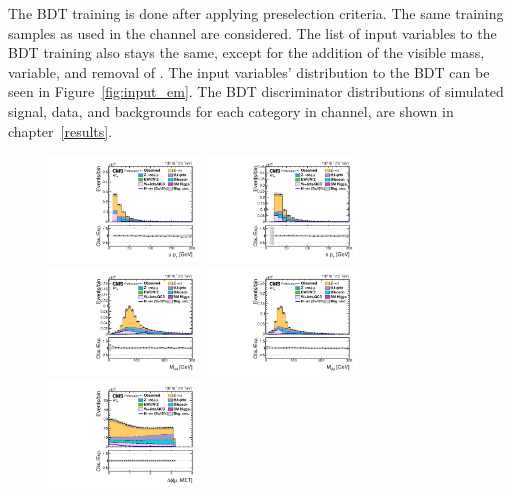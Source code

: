 The BDT training is done after applying preselection criteria. The same training samples as used in the \mue channel are considered. The list of input variables to the BDT training also stays the same, except for the addition of the visible mass, \mvis variable, and removal of \mtemet. The input variables' distribution to the BDT can be seen in Figure~\ref{fig:input_em}. The BDT discriminator distributions of simulated signal, data, and backgrounds for each category in \emu channel, are shown in chapter~\ref{results}.

\begin{figure}[htbp!]
  \centering
  \includegraphics[width=0.36\textwidth]{plots/chapter6/emu/mPt.pdf}
  \includegraphics[width=0.36\textwidth]{plots/chapter6/emu/ePt.pdf}\\
  \includegraphics[width=0.36\textwidth]{plots/chapter6/emu/e_m_CollMass.pdf}
  \includegraphics[width=0.36\textwidth]{plots/chapter6/emu/e_m_Mass.pdf}\\
  \includegraphics[width=0.36\textwidth]{plots/chapter6/emu/dPhiMuMET.pdf}

\end{figure}
